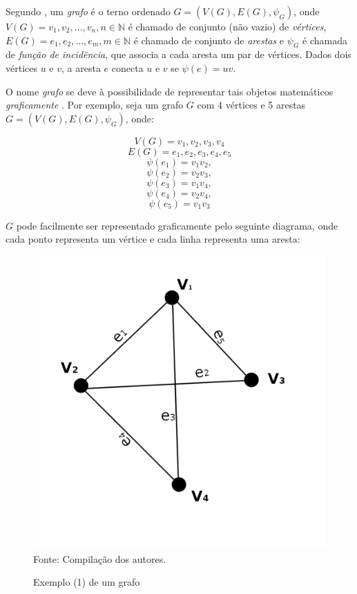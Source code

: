 \documentclass[twocolumn, 10pt]{extarticle}
\begin{document}
Segundo \cite[p. 1]{bondy}, um \textit{grafo} é o terno ordenado $G = (V(G), E(G), \psi_G)$, onde $V(G) = {v_1, v_2,\dots,v_n}, n \in \mathbb{N}$ é chamado de conjunto (não vazio) de \textit{vértices}, $E(G) = {e_1, e_2,\dots,e_m}, m \in \mathbb{N}$ é chamado de conjunto de \textit{arestas} e $\psi_G$ é chamada de \textit{função de incidência}, que associa a cada aresta um par de vértices. Dados dois vértices $u$ e $v$, a aresta $e$ conecta $u$ e $v$ se $\psi(e) = uv$. 

O nome \textit{grafo} se deve à possibilidade de representar tais objetos matemáticos \textit{graficamente} \cite[p. 2]{bondy}. Por exemplo, seja um grafo $G$ com 4 vértices e 5 arestas $G = (V(G), E(G), \psi_G)$, onde:

\[
V(G) = {v_1, v_2, v_3, v_4}
\]
\[
E(G) = {e_1, e_2, e_3, e_4, e_5}
\]
\[
\psi(e_1) = v_1v_2,\]
\[
\psi(e_2) = v_2v_3, 
\]
\[
\psi(e_3) = v_1v_4,
\]
\[
\psi(e_4) = v_2v_4, 
\]
\[
\psi(e_5) = v_1v_3
\]

$G$ pode facilmente ser representado graficamente pelo seguinte diagrama, onde cada ponto representa um vértice e cada linha representa uma aresta:

\begin{figure}[H]
	\caption{Exemplo (1) de um grafo} 
	\centering
	\includegraphics[scale=0.6]{grafo1}
	\\ Fonte: Compilação dos autores.
\end{figure}
\end{document}
